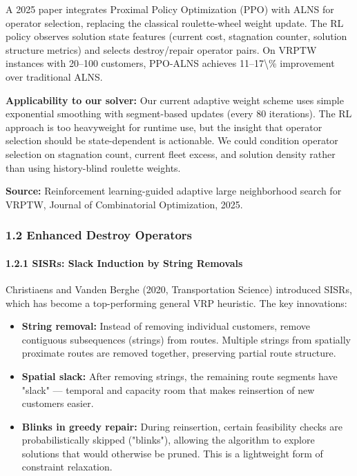 \documentclass[twocolumn,10pt,letterpaper]{article}
\begin{document}
A 2025 paper integrates Proximal Policy Optimization (PPO) with ALNS for operator selection, replacing the classical roulette-wheel weight update. The RL policy observes solution state features (current cost, stagnation counter, solution structure metrics) and selects destroy/repair operator pairs. On VRPTW instances with 20--100 customers, PPO-ALNS achieves 11--17\textbackslash{}\% improvement over traditional ALNS.


\textbf{Applicability to our solver:} Our current adaptive weight scheme uses simple exponential smoothing with segment-based updates (every 80 iterations). The RL approach is too heavyweight for runtime use, but the insight that operator selection should be state-dependent is actionable. We could condition operator selection on stagnation count, current fleet excess, and solution density rather than using history-blind roulette weights.


\textbf{Source:} Reinforcement learning-guided adaptive large neighborhood search for VRPTW, Journal of Combinatorial Optimization, 2025.


\subsubsection{1.2 Enhanced Destroy Operators}

\paragraph{1.2.1 SISRs: Slack Induction by String Removals}

Christiaens and Vanden Berghe (2020, Transportation Science) introduced SISRs, which has become a top-performing general VRP heuristic. The key innovations:


\begin{itemize}
\setlength{\itemsep}{0pt}
\setlength{\parskip}{0pt}
  \item \textbf{String removal:} Instead of removing individual customers, remove contiguous subsequences (strings) from routes. Multiple strings from spatially proximate routes are removed together, preserving partial route structure.
  \item \textbf{Spatial slack:} After removing strings, the remaining route segments have "slack" --- temporal and capacity room that makes reinsertion of new customers easier.
  \item \textbf{Blinks in greedy repair:} During reinsertion, certain feasibility checks are probabilistically skipped ("blinks"), allowing the algorithm to explore solutions that would otherwise be pruned. This is a lightweight form of constraint relaxation.
\end{itemize}
\end{document}
